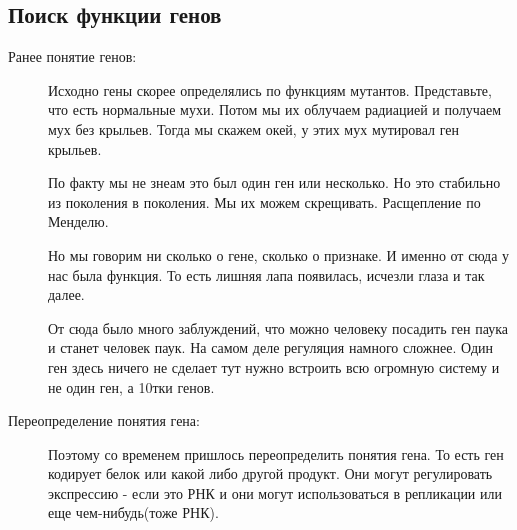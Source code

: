 \subsection{Поиск функции генов} 
\begin{description}
\item[Ранее понятие генов:]
Исходно гены скорее определялись по функциям мутантов.
Представьте, что есть нормальные мухи. Потом мы их облучаем
радиацией и получаем мух без крыльев. Тогда
мы скажем окей, у этих мух
мутировал ген крыльев.

По факту мы не знеам это был один ген или несколько. Но это
стабильно из поколения в поколения. Мы их можем скрещивать.
Расщепление по Менделю.

Но мы говорим ни сколько о гене, сколько о признаке. И именно от сюда у нас была функция.
То есть лишняя лапа появилась, исчезли глаза и так далее.

От сюда было много заблуждений, что можно человеку посадить ген паука и станет человек паук.
На самом деле регуляция намного сложнее. Один ген здесь ничего не сделает тут
нужно встроить всю огромную систему и не один ген, а 10тки генов.

\item[Переопределение понятия гена:]
Поэтому со временем пришлось переопределить понятия гена. То есть ген кодирует
белок или какой либо другой продукт. Они могут регулировать экспрессию -
если это РНК и они могут использоваться в репликации или еще чем-нибудь(тоже РНК).
\end{description}
 
